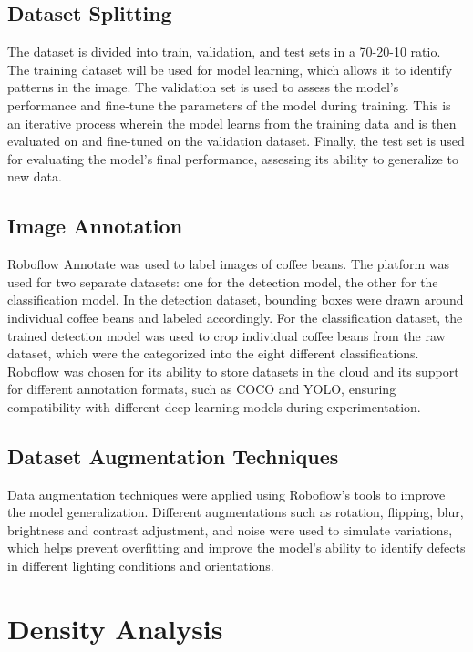 \subsection{Dataset Splitting}

The dataset is divided into train, validation, and test sets in a 70-20-10 ratio. The training dataset will be used for model learning, which allows it to identify patterns in the image. The validation set is used to assess the model’s performance and fine-tune the parameters of the model during training. This is an iterative process wherein the model learns from the training data and is then evaluated on and fine-tuned on the validation dataset. Finally, the test set is used for evaluating the model’s final performance, assessing its ability to generalize to new data.

\subsection{Image Annotation}

Roboflow Annotate was used to label images of coffee beans. The platform was used for two separate datasets: one for the detection model, the other for the classification model. In the detection dataset, bounding boxes were drawn around individual coffee beans and labeled accordingly. For the classification dataset, the trained detection model was used to crop individual coffee beans from the raw dataset, which were the categorized into the eight different classifications. Roboflow was chosen for its ability to store datasets in the cloud and its support for different annotation formats, such as COCO and YOLO, ensuring compatibility with different deep learning models during experimentation.

\subsection{Dataset Augmentation Techniques}

Data augmentation techniques were applied using Roboflow’s tools to improve the model generalization. Different augmentations such as rotation, flipping, blur, brightness and contrast adjustment, and noise were used to simulate variations, which helps prevent overfitting and improve the model’s ability to identify defects in different lighting conditions and orientations.

\section{Density Analysis}
\label{sec:density_analysis}

